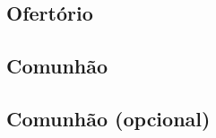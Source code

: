 \subsection{Ofertório}\label{subsection:tempus-paschale/dominica-pentecostes/offertorium}

\subsection{Comunhão}\label{subsection:tempus-paschale/dominica-pentecostes/communio}

\subsection{Comunhão (opcional)}\label{subsection:tempus-paschale/dominica-pentecostes/communio-ad-libitum}
